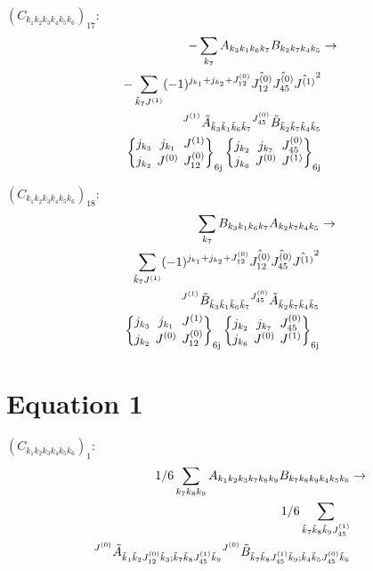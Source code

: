 \documentclass[11pt]{article}
\newcommand{\sixj}[6]{\begingroup\setlength{\arraycolsep}{0.2em}\begin{Bmatrix} #1 & #2 & #3 \\ #4 & #5 & #6 \end{Bmatrix}_{\text{6j}}\endgroup}
\begin{document}
$\left({C}_{{k}_{1}{k}_{2}{k}_{3}{k}_{4}{k}_{5}{k}_{6}}\right)_{17}$:
\begin{align}
-\sum_{{k}_{7}}{A}_{{k}_{3}{k}_{1}{k}_{6}{k}_{7}}{B}_{{k}_{2}{k}_{7}{k}_{4}{k}_{5}}&\rightarrow \notag \\-\sum_{\tilde{k}_{7}J^{(1)}}(-1)^{j_{{k}_{1}} +j_{{k}_{2}} +J^{(0)}_{12} }\hat{J^{(0)}_{12}}\hat{J^{(0)}_{45}}\hat{J^{(1)}}^{2}& \notag \\{}^{J^{(1)}}\tilde{A}_{\tilde{k}_{3}\tilde{k}_{1}\tilde{k}_{6}\tilde{k}_{7}}{}^{J^{(0)}_{45}}\tilde{B}_{\tilde{k}_{2}\tilde{k}_{7}\tilde{k}_{4}\tilde{k}_{5}}& \notag \\\sixj{j_{{k}_{3}}}{j_{{k}_{1}}}{J^{(1)}}{j_{{k}_{2}}}{J^{(0)}}{J^{(0)}_{12}}\sixj{j_{{k}_{2}}}{j_{{k}_{7}}}{J^{(0)}_{45}}{j_{{k}_{6}}}{J^{(0)}}{J^{(1)}}
\end{align}

$\left({C}_{{k}_{1}{k}_{2}{k}_{3}{k}_{4}{k}_{5}{k}_{6}}\right)_{18}$:
\begin{align}
\sum_{{k}_{7}}{B}_{{k}_{3}{k}_{1}{k}_{6}{k}_{7}}{A}_{{k}_{2}{k}_{7}{k}_{4}{k}_{5}}&\rightarrow \notag \\\sum_{\tilde{k}_{7}J^{(1)}}(-1)^{j_{{k}_{1}} +j_{{k}_{2}} +J^{(0)}_{12} }\hat{J^{(0)}_{12}}\hat{J^{(0)}_{45}}\hat{J^{(1)}}^{2}& \notag \\{}^{J^{(1)}}\tilde{B}_{\tilde{k}_{3}\tilde{k}_{1}\tilde{k}_{6}\tilde{k}_{7}}{}^{J^{(0)}_{45}}\tilde{A}_{\tilde{k}_{2}\tilde{k}_{7}\tilde{k}_{4}\tilde{k}_{5}}& \notag \\\sixj{j_{{k}_{3}}}{j_{{k}_{1}}}{J^{(1)}}{j_{{k}_{2}}}{J^{(0)}}{J^{(0)}_{12}}\sixj{j_{{k}_{2}}}{j_{{k}_{7}}}{J^{(0)}_{45}}{j_{{k}_{6}}}{J^{(0)}}{J^{(1)}}
\end{align}

\section{Equation 1}
$\left({C}_{{k}_{1}{k}_{2}{k}_{3}{k}_{4}{k}_{5}{k}_{6}}\right)_{1}$:
\begin{align}
1/6\sum_{{k}_{7}{k}_{8}{k}_{9}}{A}_{{k}_{1}{k}_{2}{k}_{3}{k}_{7}{k}_{8}{k}_{9}}{B}_{{k}_{7}{k}_{8}{k}_{9}{k}_{4}{k}_{5}{k}_{6}}&\rightarrow \notag \\1/6\sum_{\tilde{k}_{7}\tilde{k}_{8}\tilde{k}_{9}J^{(1)}_{45}}& \notag \\{}^{J^{(0)}}\tilde{A}_{\tilde{k}_{1}\tilde{k}_{2}J^{(0)}_{12}\tilde{k}_{3};\tilde{k}_{7}\tilde{k}_{8}J^{(1)}_{45}\tilde{k}_{9}}{}^{J^{(0)}}\tilde{B}_{\tilde{k}_{7}\tilde{k}_{8}J^{(1)}_{45}\tilde{k}_{9};\tilde{k}_{4}\tilde{k}_{5}J^{(0)}_{45}\tilde{k}_{6}}& \notag \\
\end{align}
\end{document}
